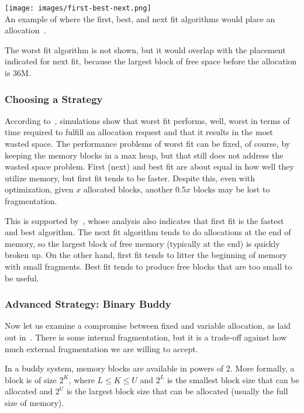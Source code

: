 \begin{center}
\texttt{[image: images/first-best-next.png]}\\
An example of where the first, best, and next fit algorithms would place an allocation~\cite{osi}.
\end{center}

The worst fit algorithm is not shown, but it would overlap with the placement indicated for next fit, because the largest block of free space before the allocation is 36M.

\subsubsection*{Choosing a Strategy}

According to~\cite{osc}, simulations show that worst fit performs, well, worst in terms of time required to fulfill an allocation request and that it results in the most wasted space. The performance problems of worst fit can be fixed, of course, by keeping the memory blocks in a max heap, but that still does not address the wasted space problem. First (next) and best fit are about equal in how well they utilize memory, but first fit tends to be faster. Despite this, even with optimization, given $x$ allocated blocks, another 0.5$x$ blocks may be lost to fragmentation.

This is supported by~\cite{osi}, whose analysis also indicates that first fit is the fastest and best algorithm. The next fit algorithm tends to do allocations at the end of memory, so the largest block of free memory (typically at the end) is quickly broken up. On the other hand, first fit tends to litter the beginning of memory with small fragments. Best fit tends to produce free blocks that are too small to be useful. 

\subsubsection*{Advanced Strategy: Binary Buddy}
Now let us examine a compromise between fixed and variable allocation, as laid out in~\cite{osi}. There is some internal fragmentation, but it is a trade-off against how much external fragmentation we are willing to accept.

In a buddy system, memory blocks are available in powers of 2. More formally, a block is of size $2^{K}$, where $L \leq K \leq U$ and $2^{L}$ is the smallest block size that can be allocated and $2^{U}$ is the largest block size that can be allocated (usually the full size of memory). 

